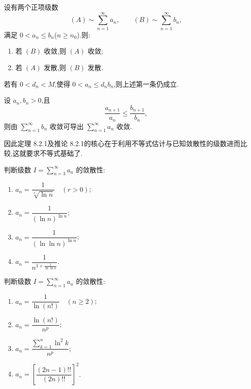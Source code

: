 \documentclass[../数学分析培优讲义.tex]{subfiles}
\begin{document}

\begin{theorem}[\marktwostar]
设有两个正项级数
\[
    (A)\sim\sum\limits_{n=1}^{\infty}a_n,
    \qquad
    (B)\sim\sum\limits_{n=1}^{\infty}b_n,
\]
满足 $0<a_n\leq b_n$($n\geq n_0$).则:
\begin{enumerate}[label=(\arabic*)]
    \item 若 $(B)$ 收敛,则 $(A)$ 收敛;
    \item 若 $(A)$ 发散,则 $(B)$ 发散.
\end{enumerate}
\end{theorem}

\begin{remark}
若有 $0<d_n<M$,使得 $0<a_n\leq d_nb_n$,则上述第一条仍成立.
\end{remark}

\begin{corollary}[\marktwostar]
设 $a_n,b_n>0$,且
\[
    \dfrac{a_{n+1}}{a_n}\leq\dfrac{b_{n+1}}{b_n},
\]
则由 $\displaystyle\sum\limits_{n=1}^{\infty}b_n$ 收敛可导出 $\displaystyle\sum\limits_{n=1}^{\infty}a_n$ 收敛.
\end{corollary}

\begin{remark}
因此定理 8.2.1及推论 8.2.1的核心在于利用不等式估计与已知敛散性的级数进而比较,这就要求不等式基础了.
\end{remark}

\begin{example}
判断级数 $\displaystyle I=\sum\limits_{n=3}^{\infty}a_n$ 的敛散性:
\begin{enumerate}[label=(\arabic*)]
    \item $\displaystyle a_n=\dfrac{1}{\sqrt[r]{\ln n}}\quad(r>0)$;
    \item $\displaystyle a_n=\dfrac{1}{(\ln n)^{\ln n}}$;
    \item $\displaystyle a_n=\dfrac{1}{(\ln\ln n)^{\ln n}}$;
    \item $\displaystyle a_n=\dfrac{1}{n^{1+\frac{1}{\ln\ln n}}}$.
\end{enumerate}
\end{example}
\exampleblank

\begin{example}
判断级数 $\displaystyle I=\sum\limits_{n=1}^{\infty}a_n$ 的敛散性:
\begin{enumerate}[label=(\arabic*)]
    \item $\displaystyle a_n=\dfrac{1}{\ln(n!)}\quad(n\geq2)$;
    \item $\displaystyle a_n=\dfrac{\ln(n!)}{n^p}$;
    \item $\displaystyle a_n=\dfrac{\sum\limits_{k=1}^n\ln^2k}{n^p}$;
    \item $\displaystyle a_n=\left[\dfrac{(2n-1)!!}{(2n)!!}\right]^2$.
\end{enumerate}
\end{example}
\exampleblank
\end{document}
